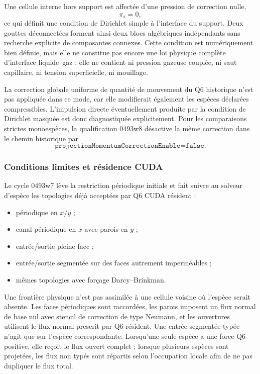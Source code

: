 \documentclass[11pt,a4paper]{article}
\begin{document}
Une cellule interne hors support est affectée d'une pression de correction nulle,
\begin{equation}
  \pi_s=0,
\end{equation}
ce qui définit une condition de Dirichlet simple à l'interface du support. Deux gouttes déconnectées forment ainsi deux blocs algébriques indépendants sans recherche explicite de composantes connexes. Cette condition est numériquement bien définie, mais elle ne constitue pas encore une loi physique complète d'interface liquide--gaz : elle ne contient ni pression gazeuse couplée, ni saut capillaire, ni tension superficielle, ni mouillage.

La correction globale uniforme de quantité de mouvement du Q6 historique n'est pas appliquée dans ce mode, car elle modifierait également les espèces déclarées compressibles. L'impulsion directe éventuellement produite par la condition de Dirichlet masquée est donc diagnostiquée explicitement. Pour les comparaisons strictes monoespèces, la qualification 0493w8 désactive la même correction dans le chemin historique par
\begin{equation}
  \texttt{projectionMomentumCorrectionEnable=false}.
\end{equation}

\subsubsection{Conditions limites et résidence CUDA}

Le cycle 0493w7 lève la restriction périodique initiale et fait suivre au solveur d'espèce les topologies déjà acceptées par Q6 CUDA résident :
\begin{itemize}[nosep]
  \item périodique en $x/y$ ;
  \item canal périodique en $x$ avec parois en $y$ ;
  \item entrée/sortie pleine face ;
  \item entrée/sortie segmentée sur des faces autrement imperméables ;
  \item mêmes topologies avec forçage Darcy--Brinkman.
\end{itemize}
Une frontière physique n'est pas assimilée à une cellule voisine où l'espèce serait absente. Les faces périodiques sont raccordées, les parois imposent un flux normal de base nul avec stencil de correction de type Neumann, et les ouvertures utilisent le flux normal prescrit par Q6 résident. Une entrée segmentée typée n'agit que sur l'espèce correspondante. Lorsqu'une seule espèce a une force Q6 positive, elle reçoit le flux ouvert complet ; lorsque plusieurs espèces sont projetées, les flux non typés sont répartis selon l'occupation locale afin de ne pas dupliquer le flux total.
\end{document}
